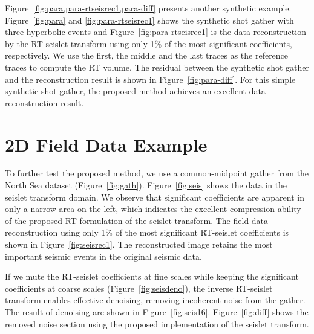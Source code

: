 
    Figure~\ref{fig:para,para-rtseisrec1,para-diff} presents another synthetic 
    example. 
    Figure~\ref{fig:para} and \ref{fig:para-rtseisrec1} shows the synthetic shot 
    gather with three hyperbolic events and Figure~\ref{fig:para-rtseisrec1} is 
    the data reconstruction by the RT-seislet transform using only 1\% of the 
    most significant coefficients, respectively. 
    We use the first, the middle and the last traces as the reference traces to 
    compute the RT volume.
    The residual between the synthetic shot gather and the reconstruction
    result is shown in Figure~\ref{fig:para-diff}.
    For this simple synthetic shot gather, the proposed method achieves an 
    excellent data reconstruction result.

    
\section{2D Field Data Example}
    To further test the proposed method, we use a common-midpoint gather from 
    the North Sea dataset (Figure~\ref{fig:gath}). 
    Figure~\ref{fig:seis} shows the data in the seislet transform domain. 
    We observe that significant coefficients are apparent in only a narrow area 
    on the left, which indicates the excellent compression ability of the 
    proposed RT formulation of the seislet transform. 
    The field data reconstruction using only 1\% of the most significant 
    RT-seislet coefficients is shown in Figure~\ref{fig:seisrec1}. 
    The reconstructed image retains the most important seismic events in the 
    original seismic data.

    If we mute the RT-seislet coefficients at fine scales while keeping the 
    significant coefficients at coarse scales (Figure~\ref{fig:seisdeno}), the 
    inverse RT-seislet transform enables effective denoising, removing 
    incoherent noise from the gather. 
    The result of denoising are shown in Figure~\ref{fig:seis16}. 
    Figure~\ref{fig:diff} shows the removed noise section using the proposed 
    implementation of the seislet transform.

